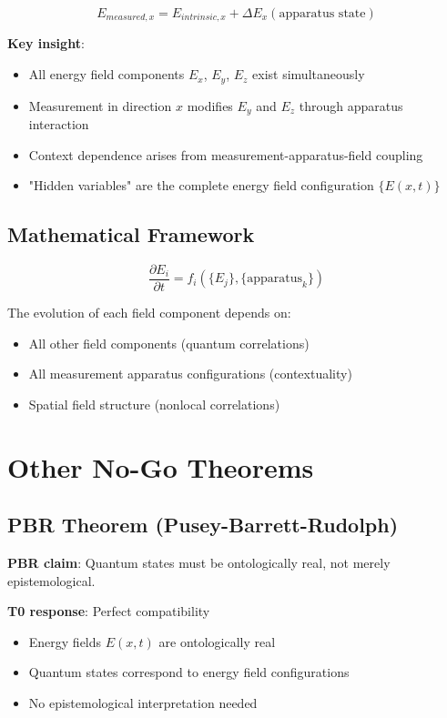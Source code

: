 \documentclass[12pt,a4paper]{article}
\newcommand{\Efield}{E}
\begin{document}
	\begin{equation}
		\Efield_{measured,x} = \Efield_{intrinsic,x} + \Delta\Efield_x(\text{apparatus state})
	\end{equation}
	
	\textbf{Key insight}: 
	\begin{itemize}
		\item All energy field components $\Efield_x$, $\Efield_y$, $\Efield_z$ exist simultaneously
		\item Measurement in direction $x$ modifies $\Efield_y$ and $\Efield_z$ through apparatus interaction
		\item Context dependence arises from measurement-apparatus-field coupling
		\item "Hidden variables" are the complete energy field configuration $\{\Efield(x,t)\}$
	\end{itemize}
	
	\subsection{Mathematical Framework}
	
	\begin{equation}
		\frac{\partial \Efield_i}{\partial t} = f_i(\{\Efield_j\}, \{\text{apparatus}_k\})
	\end{equation}
	
	The evolution of each field component depends on:
	\begin{itemize}
		\item All other field components (quantum correlations)
		\item All measurement apparatus configurations (contextuality)
		\item Spatial field structure (nonlocal correlations)
	\end{itemize}
	
	\section{Other No-Go Theorems}
	
	\subsection{PBR Theorem (Pusey-Barrett-Rudolph)}
	
	\textbf{PBR claim}: Quantum states must be ontologically real, not merely epistemological.
	
	\textbf{T0 response}: Perfect compatibility
	\begin{itemize}
		\item Energy fields $\Efield(x,t)$ are ontologically real
		\item Quantum states correspond to energy field configurations
		\item No epistemological interpretation needed
	\end{itemize}
	
\end{document}
